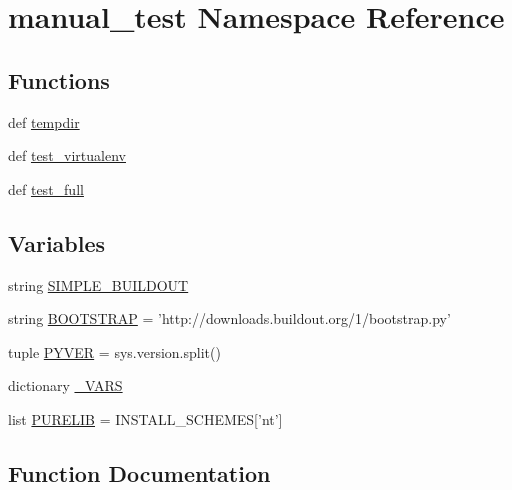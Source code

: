 \hypertarget{namespacemanual__test}{}\section{manual\+\_\+test Namespace Reference}
\label{namespacemanual__test}
\subsection*{Functions}
\begin{DoxyCompactItemize}
\item 
def \hyperlink{namespacemanual__test_ac03d501054639936e93bb98b418c9276}{tempdir}
\item 
def \hyperlink{namespacemanual__test_a02bace02f97e0ccb22b99d22d035ab43}{test\+\_\+virtualenv}
\item 
def \hyperlink{namespacemanual__test_ae2dcd9871f36567af8bc12bd3b27712c}{test\+\_\+full}
\end{DoxyCompactItemize}
\subsection*{Variables}
\begin{DoxyCompactItemize}
\item 
string \hyperlink{namespacemanual__test_a90a129b17e1a45d7248fe9225291e3be}{S\+I\+M\+P\+L\+E\+\_\+\+B\+U\+I\+L\+D\+O\+U\+T}
\item 
string \hyperlink{namespacemanual__test_abd3feaea31bfb042e85d714c64e13067}{B\+O\+O\+T\+S\+T\+R\+A\+P} = 'http\+://downloads.\+buildout.\+org/1/bootstrap.\+py'
\item 
tuple \hyperlink{namespacemanual__test_a76e8acbfa8f2cb2b4e4813dfe3ec0f6a}{P\+Y\+V\+E\+R} = sys.\+version.\+split()
\item 
dictionary \hyperlink{namespacemanual__test_af7bff7bfba8c3bc48443f7bdb3777b6e}{\+\_\+\+V\+A\+R\+S}
\item 
list \hyperlink{namespacemanual__test_a41aae3a24930c8def6a16e229caf9e68}{P\+U\+R\+E\+L\+I\+B} = I\+N\+S\+T\+A\+L\+L\+\_\+\+S\+C\+H\+E\+M\+E\+S\mbox{[}'nt'\mbox{]}
\end{DoxyCompactItemize}


\subsection{Function Documentation}
\hypertarget{namespacemanual__test_ac03d501054639936e93bb98b418c9276}{}
